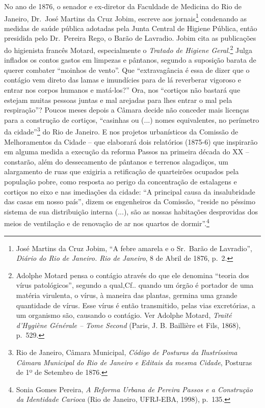 No ano de 1876, o senador e ex-diretor da Faculdade de Medicina do Rio
de Janeiro, Dr.~José Martins da Cruz Jobim, escreve aos
jornais\footnote{José Martins da Cruz Jobim, ``A febre amarela e o
  Sr.~Barão de Lavradio'', \emph{Diário do Rio de Janeiro. Rio de
  Janeiro}, 8 de Abril de 1876, p.~2.} condenando as medidas de saúde
pública adotadas pela Junta Central de Higiene Pública, então presidida
pelo Dr.~Pereira Rego, o Barão de Lavradio. Jobim cita as publicações do
higienista francês Motard, especialmente o \emph{Tratado de Higiene
Geral}.\footnote{Adolphe Motard pensa o contágio através do que ele
  denomina ``teoria dos vírus patológicos'', segundo a qual,Cf.. quando
  um órgão é portador de uma matéria virulenta, o vírus, à maneira das
  plantas, germina uma grande quantidade de vírus. Esse vírus é então
  transmitido, pelas vias excretórias, a um organismo são, causando o
  contágio. Ver Adolphe Motard, \emph{Traité d'Hygiène Générale -- Tome
  Second} (Paris, J. B. Baillière et Fils, 1868), p.~529.} Julga
inflados os contos gastos em limpezas e pântanos, segundo a suposição
barata de querer combater ``moinhos de vento''. Que ``extravagância é
essa de dizer que o contágio vem direto das lamas e imundícies para de
lá reverberar vigoroso e entrar nos corpos humanos e matá-los?'' Ora,
nos ``cortiços não bastará que estejam muitas pessoas juntas e mal
arejadas para lhes entrar o mal pela respiração''? Poucos meses depois a
Câmara decide não conceder mais licenças para a construção de cortiços,
``casinhas ou (...) nomes equivalentes, no perímetro da
cidade''\footnote{Rio de Janeiro, Câmara Municipal, \emph{Código de
  Posturas da Ilustríssima Câmara Municipal do Rio de Janeiro e Editais
  da mesma Cidade}, Posturas de 1º de Setembro de 1876.} do Rio de
Janeiro. E nos projetos urbanísticos da Comissão de Melhoramentos da
Cidade -- que elaborará dois relatórios (1875-6) que inspirarão em
alguma medida a execução da reforma Passos na primeira década do XX --
constarão, além do dessecamento de pântanos e terrenos alagadiços, um
alargamento de ruas que exigiria a retificação de quarteirões ocupados
pela população pobre, como resposta ao perigo da concentração de
estalagens e cortiços no eixo e nas imediações da cidade: ``A principal
causa da insalubridade das casas em nosso país'', dizem os engenheiros
da Comissão, ``reside no péssimo sistema de sua distribuição interna
(...), são as nossas habitações desprovidas dos meios de ventilação e de
renovação de ar nos quartos de dormir''.\footnote{Sonia Gomes Pereira,
  \emph{A Reforma Urbana de Pereira Passos e a Construção da Identidade
  Carioca} (Rio de Janeiro, UFRJ-EBA, 1998), p.~135.}

